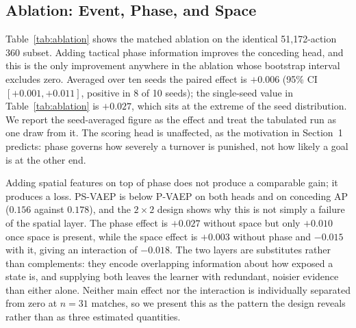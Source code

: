 \documentclass[runningheads]{llncs}
\begin{document}
\subsection{Ablation: Event, Phase, and Space}
\label{sec:ablation}

Table~\ref{tab:ablation} shows the matched ablation on the identical 51,172-action 360 subset. Adding tactical phase information improves the conceding head, and this is the only improvement anywhere in the ablation whose bootstrap interval excludes zero. Averaged over ten seeds the paired effect is $+0.006$ (95\% CI $[+0.001, +0.011]$, positive in 8 of 10 seeds); the single-seed value in Table~\ref{tab:ablation} is $+0.027$, which sits at the extreme of the seed distribution. We report the seed-averaged figure as the effect and treat the tabulated run as one draw from it. The scoring head is unaffected, as the motivation in Section~1 predicts: phase governs how severely a turnover is punished, not how likely a goal is at the other end.

Adding spatial features on top of phase does not produce a comparable gain; it produces a loss. PS-VAEP is below P-VAEP on both heads and on conceding AP ($0.156$ against $0.178$), and the $2 \times 2$ design shows why this is not simply a failure of the spatial layer. The phase effect is $+0.027$ without space but only $+0.010$ once space is present, while the space effect is $+0.003$ without phase and $-0.015$ with it, giving an interaction of $-0.018$. The two layers are substitutes rather than complements: they encode overlapping information about how exposed a state is, and supplying both leaves the learner with redundant, noisier evidence than either alone. Neither main effect nor the interaction is individually separated from zero at $n = 31$ matches, so we present this as the pattern the design reveals rather than as three estimated quantities.
\end{document}
